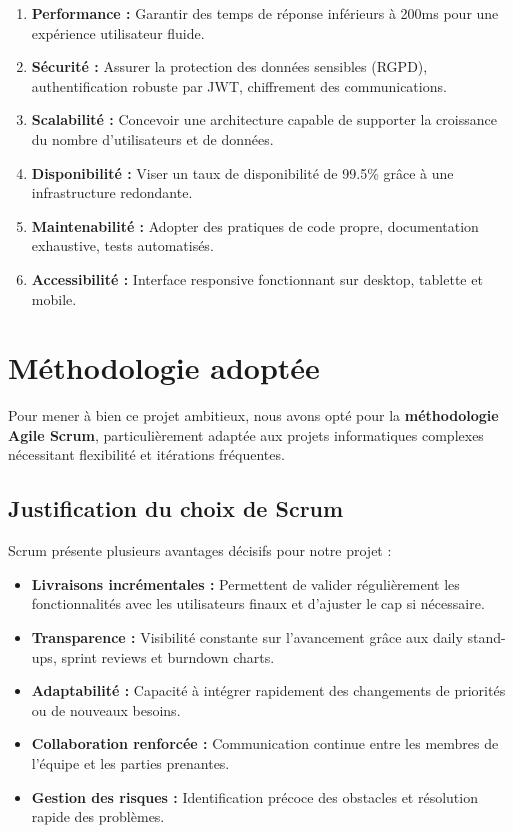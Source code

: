 \begin{enumerate}
    \item \textbf{Performance :} Garantir des temps de réponse inférieurs à 200ms pour une expérience utilisateur fluide.
    
    \item \textbf{Sécurité :} Assurer la protection des données sensibles (RGPD), authentification robuste par JWT, chiffrement des communications.
    
    \item \textbf{Scalabilité :} Concevoir une architecture capable de supporter la croissance du nombre d'utilisateurs et de données.
    
    \item \textbf{Disponibilité :} Viser un taux de disponibilité de 99.5\% grâce à une infrastructure redondante.
    
    \item \textbf{Maintenabilité :} Adopter des pratiques de code propre, documentation exhaustive, tests automatisés.
    
    \item \textbf{Accessibilité :} Interface responsive fonctionnant sur desktop, tablette et mobile.
\end{enumerate}

\section*{Méthodologie adoptée}

Pour mener à bien ce projet ambitieux, nous avons opté pour la \textbf{méthodologie Agile Scrum}, particulièrement adaptée aux projets informatiques complexes nécessitant flexibilité et itérations fréquentes.

\subsection*{Justification du choix de Scrum}

Scrum présente plusieurs avantages décisifs pour notre projet :

\begin{itemize}
    \item \textbf{Livraisons incrémentales :} Permettent de valider régulièrement les fonctionnalités avec les utilisateurs finaux et d'ajuster le cap si nécessaire.
    
    \item \textbf{Transparence :} Visibilité constante sur l'avancement grâce aux daily stand-ups, sprint reviews et burndown charts.
    
    \item \textbf{Adaptabilité :} Capacité à intégrer rapidement des changements de priorités ou de nouveaux besoins.
    
    \item \textbf{Collaboration renforcée :} Communication continue entre les membres de l'équipe et les parties prenantes.
    
    \item \textbf{Gestion des risques :} Identification précoce des obstacles et résolution rapide des problèmes.
\end{itemize}

